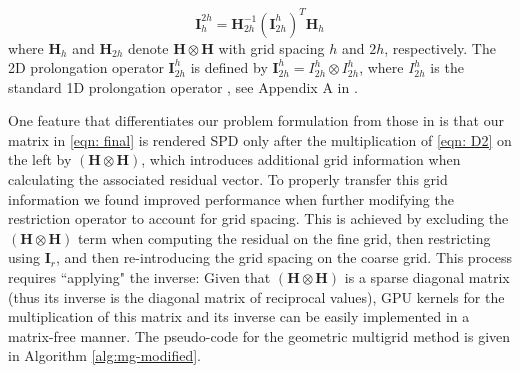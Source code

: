 \begin{equation}
    \boldsymbol{I}_{h}^{2h} = \boldsymbol{H}_{2h}^{-1} \left(\boldsymbol{I}_{2h}^h\right)^T\boldsymbol{H}_h
\end{equation}
%
where $\boldsymbol{H}_{h}$ and $\boldsymbol{H}_{2h}$ denote $\boldsymbol{H} \otimes \boldsymbol{H}$ with grid spacing $h$ and $2h$, respectively. The 2D prolongation operator $\boldsymbol{I}_{2h}^h$ is defined by $\boldsymbol{I}_{2h}^h = I_{2h}^h \otimes I_{2h}^h$, where $I_{2h}^h$ is the standard 1D prolongation operator \cite{Briggs2000}, see Appendix A in \cite{Ruggiu2018}.

One feature that differentiates our problem formulation from those in \cite{Ruggiu2018} is that our matrix in \eqref{eqn: final} is rendered SPD only after the multiplication of \eqref{eqn: D2} on the left by $\left(\boldsymbol{H} \otimes \boldsymbol{H} \right)$, which introduces additional grid information when calculating the associated residual vector. To properly transfer this grid information we found improved performance when further modifying the restriction operator to account for grid spacing. This is achieved by excluding the $\left(\boldsymbol{H} \otimes \boldsymbol{H} \right)$ term when computing the residual on the fine grid, then restricting using $\boldsymbol{I}_r$, and then re-introducing the grid spacing on the coarse grid. This process requires ``applying" the inverse: Given that $\left(\boldsymbol{H} \otimes \boldsymbol{H} \right)$ is a sparse diagonal matrix (thus its inverse is the diagonal matrix of reciprocal values), GPU kernels for the multiplication of this matrix and its inverse can be easily implemented in a matrix-free manner. The pseudo-code for the geometric multigrid method is given in Algorithm \autoref{alg:mg-modified}.





